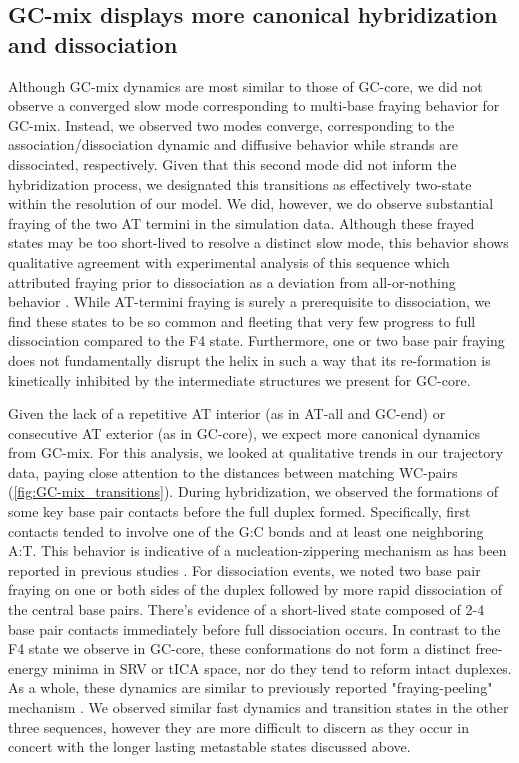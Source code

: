 \documentclass[journal=jpcbfk,manuscript=article]{achemso}
\begin{document}

\subsection{GC-mix displays more canonical hybridization and dissociation}
Although GC-mix dynamics are most similar to those of GC-core, we did not observe a converged slow mode corresponding to multi-base fraying behavior for GC-mix. Instead, we observed two modes converge, corresponding to the association/dissociation dynamic and diffusive behavior while strands are dissociated, respectively. Given that this second mode did not inform the hybridization process, we designated this transitions as effectively two-state within the resolution of our model. We did, however, we do observe substantial fraying of the two AT termini in the simulation data. Although these frayed states may be too short-lived to resolve a distinct slow mode, this behavior shows qualitative agreement with experimental analysis of this sequence which attributed fraying prior to dissociation as a deviation from all-or-nothing behavior \citep{Sanstead2016}.  While AT-termini fraying is surely a prerequisite to dissociation, we find these states to be so common and fleeting that very few progress to full dissociation compared to the F4 state. Furthermore, one or two base pair fraying does not fundamentally disrupt the helix in such a way that its re-formation is kinetically inhibited by the intermediate structures we present for GC-core.  

Given the lack of a repetitive AT interior (as in AT-all and GC-end) or consecutive AT exterior (as in GC-core), we expect more canonical dynamics from GC-mix. For this analysis, we looked at qualitative trends in our trajectory data, paying close attention to the distances between matching WC-pairs (\ref{fig:GC-mix_transitions}). During hybridization, we observed the formations of some key base pair contacts before the full duplex formed. Specifically, first contacts tended to involve one of the G:C bonds and at least one neighboring A:T. This behavior is indicative of a nucleation-zippering mechanism as has been reported in previous studies \citep{Wetmur1968KineticsDNA, Porschke1971CooperativeTransition, Yin2011KineticsHybridization}. For dissociation events, we noted two base pair fraying on one or both sides of the duplex followed by more rapid dissociation of the central base pairs. There's evidence of a short-lived state composed of 2-4 base pair contacts immediately before full dissociation occurs. In contrast to the F4 state we observe in GC-core, these conformations do not form a distinct free-energy minima in SRV or tICA space, nor do they tend to reform intact duplexes. As a whole, these dynamics are similar to previously reported "fraying-peeling" mechanism \citep{Wong2008TheSimulations, Perez2010Real-timeUnfolding, Zgarbova2014BaseRNA}. We observed similar fast dynamics and transition states in the other three sequences, however they are more difficult to discern as they occur in concert with the longer lasting metastable states discussed above.
\end{document}
